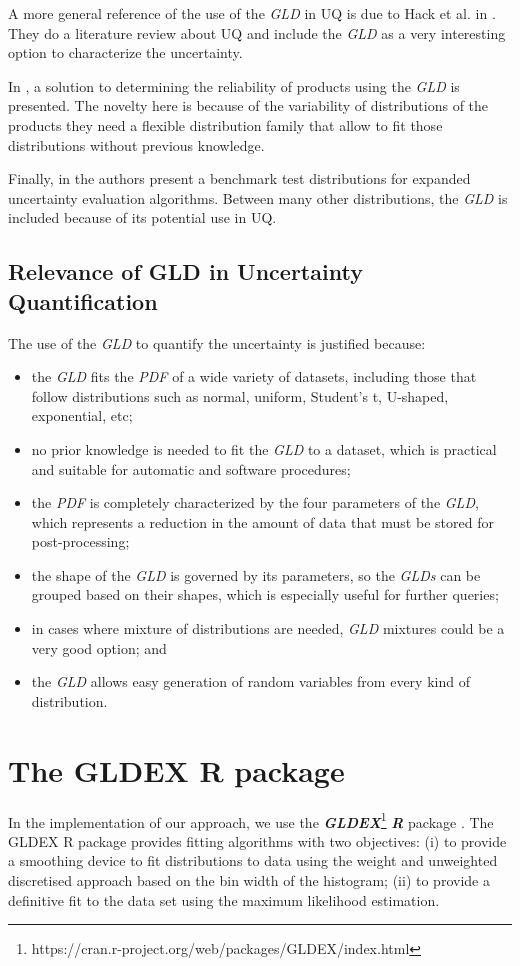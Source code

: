 A more general reference of the use of the \textit{GLD} in UQ is due to Hack et al. in \cite{da2012measurement}. They do a literature review about UQ and include the \textit{GLD} as a very interesting option to characterize the uncertainty.

In \cite{Movahedi2013}, a solution to determining the reliability of products using the \textit{GLD} is presented. The novelty here is because of the variability of distributions of the products they need a flexible distribution family that allow to fit those distributions without previous knowledge.

Finally, in \cite{Rajan2016} the authors present a benchmark test distributions for expanded uncertainty evaluation algorithms. Between many other distributions, the \textit{GLD} is included because of its potential use in UQ. 

\subsection{Relevance of GLD in Uncertainty Quantification}
The use of the \textit{GLD} to quantify the uncertainty is justified because: 
\begin{itemize}
\item the \textit{GLD} fits the \textit{PDF} of a wide variety of datasets, including those that follow distributions such as normal, uniform, Student's t, U-shaped, exponential, etc;
\item no prior knowledge is needed to fit the \textit{GLD} to a dataset, which is practical and suitable for automatic and software procedures;
\item the \textit{PDF} is completely characterized by the four parameters of the \textit{GLD}, which represents a reduction in the amount of data that must be stored for post-processing;
\item the shape of the \textit{GLD} is governed by its parameters, so the \textit{GLDs} can be grouped  based on their shapes, which is especially useful for further queries;
\item in cases where mixture of distributions are needed, \textit{GLD} mixtures could be a very good option; and
\item the \textit{GLD} allows easy generation of random variables from every kind of distribution.
\end{itemize}

\section{The GLDEX R package}\label{sec:gldex}
In the implementation of our approach, we use the \textbf{\textit{GLDEX}}\footnote{https://cran.r-project.org/web/packages/GLDEX/index.html} \textbf{\textit{R}} package \cite{Su2007}. The GLDEX R package provides fitting algorithms with two objectives: (i) to provide a smoothing device to fit distributions to data using the weight and unweighted discretised approach based on the bin width of the histogram; (ii)  to provide a definitive fit to the data set using the maximum likelihood estimation.


